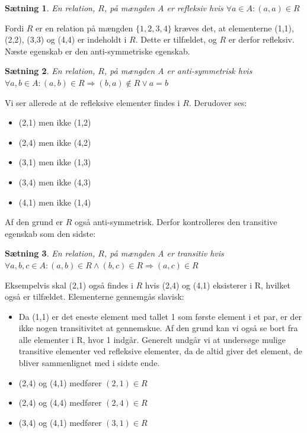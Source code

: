 \documentclass{article}
\newtheorem{theorem}{Sætning}
\begin{document}
\begin{theorem}
En relation, $R$, på mængden A er refleksiv hvis $\forall a \in A : (a,a) \in R$
\end{theorem}

Fordi $R$ er en relation på mængden $\{1, 2, 3, 4\}$ kræves det, at elementerne (1,1), (2,2), (3,3) og (4,4) er indeholdt i $R$. Dette er tilfældet, og $R$ er derfor refleksiv. Næste egenskab er den anti-symmetriske egenskab.

\begin{theorem}
En relation, $R$, på mængden A er anti-symmetrisk hvis $\forall a,b \in A : (a,b) \in R \Rightarrow (b,a) \notin R \lor a = b$
\end{theorem}

Vi ser allerede at de refleksive elementer findes i $R$. Derudover ses:

\begin{itemize}
\item (2,1) men ikke (1,2)
\item (2,4) men ikke (4,2)
\item (3,1) men ikke (1,3)
\item (3,4) men ikke (4,3)
\item (4,1) men ikke (1,4)
\end{itemize}

Af den grund er $R$ også anti-symmetrisk. Derfor kontrolleres den transitive egenskab som den sidste:

\begin{theorem}
En relation, $R$, på mængden A er transitiv hvis $\forall a,b,c \in A : (a,b)\in R \land (b,c)\in R \Rightarrow (a,c) \in R$
\end{theorem}

Eksempelvis skal (2,1) også findes i $R$ hvis (2,4) og (4,1) eksisterer i R, hvilket også er tilfældet. Elementerne gennemgås slavisk:

\begin{itemize}
\item Da (1,1) er det eneste element med tallet 1 som første element i et par, er der ikke nogen transitivitet at gennemskue. Af den grund kan vi også se bort fra alle elementer i R, hvor 1 indgår. Generelt undgår vi at undersøge mulige transitive elementer ved refleksive elementer, da de altid giver det element, de bliver sammenlignet med i sidste ende.
\item (2,4) og (4,1) medfører $(2,1) \in R$ \checkmark
\item (2,4) og (4,4) medfører $(2,4) \in R$ \checkmark
\item (3,4) og (4,1) medfører $(3,1) \in R$ \checkmark
\end{itemize}
\end{document}
